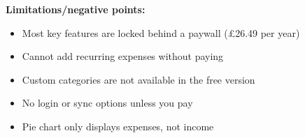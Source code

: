 \documentclass{l4proj}
\begin{document}
\begin{appendices}
\textbf{Limitations/negative points:}
\begin{itemize}
    \item Most key features are locked behind a paywall (£26.49 per year)
    \item Cannot add recurring expenses without paying
    \item Custom categories are not available in the free version
    \item No login or sync options unless you pay
    \item Pie chart only displays expenses, not income
\end{itemize}

\begin{figure}[h]
    \centering
    \begin{subfigure}[t]{0.25\textwidth}
        \vspace{0pt}

\end{subfigure}
\end{figure}
\end{appendices}
\end{document}
